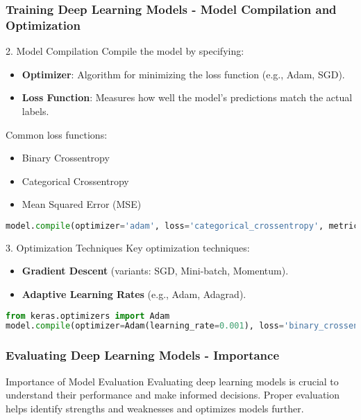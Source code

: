 \documentclass[aspectratio=169]{beamer}
\begin{document}
\begin{frame}[fragile]
    \frametitle{Training Deep Learning Models - Model Compilation and Optimization}
    \begin{block}{2. Model Compilation}
        Compile the model by specifying:
        \begin{itemize}
            \item \textbf{Optimizer}: Algorithm for minimizing the loss function (e.g., Adam, SGD).
            \item \textbf{Loss Function}: Measures how well the model's predictions match the actual labels.
        \end{itemize}
        Common loss functions:
        \begin{itemize}
            \item Binary Crossentropy
            \item Categorical Crossentropy
            \item Mean Squared Error (MSE)
        \end{itemize}
        \begin{lstlisting}[language=Python]
model.compile(optimizer='adam', loss='categorical_crossentropy', metrics=['accuracy'])
        \end{lstlisting}
    \end{block}
    
    \begin{block}{3. Optimization Techniques}
        Key optimization techniques:
        \begin{itemize}
            \item \textbf{Gradient Descent} (variants: SGD, Mini-batch, Momentum).
            \item \textbf{Adaptive Learning Rates} (e.g., Adam, Adagrad).
        \end{itemize}
        \begin{lstlisting}[language=Python]
from keras.optimizers import Adam
model.compile(optimizer=Adam(learning_rate=0.001), loss='binary_crossentropy')
        \end{lstlisting}
    \end{block}
\end{frame}

\begin{frame}[fragile]
    \frametitle{Evaluating Deep Learning Models - Importance}
    \begin{block}{Importance of Model Evaluation}
        Evaluating deep learning models is crucial to understand their performance and make informed decisions. 
        Proper evaluation helps identify strengths and weaknesses and optimizes models further.
    \end{block}
\end{frame}
\end{document}
